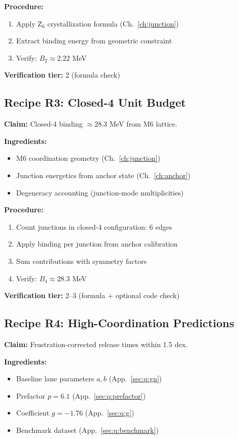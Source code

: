 \textbf{Procedure:}
\begin{enumerate}
    \item Apply Z$_6$ crystallization formula (Ch.~\ref{ch:junction})
    \item Extract binding energy from geometric constraint
    \item Verify: $B_2 \approx 2.22$ MeV
\end{enumerate}

\textbf{Verification tier:} 2 (formula check)

\subsection{Recipe R3: Closed-4 Unit Budget}
\label{sec:repro:R3}

\textbf{Claim:} Closed-4 binding $\approx 28.3$ MeV from M6 lattice. \tagDc

\textbf{Ingredients:}
\begin{itemize}
    \item M6 coordination geometry (Ch.~\ref{ch:junction})
    \item Junction energetics from anchor state (Ch.~\ref{ch:anchor})
    \item Degeneracy accounting (junction-mode multiplicities)
\end{itemize}

\textbf{Procedure:}
\begin{enumerate}
    \item Count junctions in closed-4 configuration: 6 edges
    \item Apply binding per junction from anchor calibration
    \item Sum contributions with symmetry factors
    \item Verify: $B_4 \approx 28.3$ MeV
\end{enumerate}

\textbf{Verification tier:} 2--3 (formula + optional code check)

\subsection{Recipe R4: High-Coordination Predictions}
\label{sec:repro:R4}

\textbf{Claim:} Frustration-corrected release times within 1.5 dex. \tagP

\textbf{Ingredients:}
\begin{itemize}
    \item Baseline lane parameters $a, b$ (App.~\ref{sec:q:gn}) \tagBL
    \item Prefactor $p = 6.1$ (App.~\ref{sec:q:prefactor}) \tagCal
    \item Coefficient $g = -1.76$ (App.~\ref{sec:q:g}) \tagCal
    \item Benchmark dataset (App.~\ref{sec:q:benchmark})
\end{itemize}

